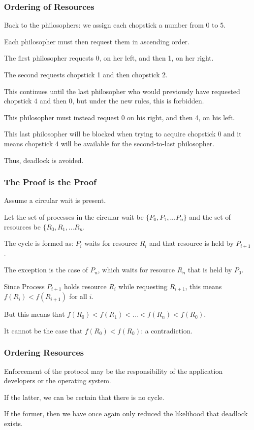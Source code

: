 \begin{frame}
\frametitle{Ordering of Resources}

Back to the philosophers: we assign each chopstick a number from 0 to 5. 

Each philosopher must then request them in ascending order. 

The first philosopher requests 0, on her left, and then 1, on her right. 

The second requests chopstick 1 and then chopstick 2. 

This continues until the last philosopher who would previously have requested chopstick 4 and then 0, but under the new rules, this is forbidden. 

This philosopher must instead request 0 on his right, and then 4, on his left. 

This last philosopher will be blocked when trying to acquire chopstick 0 and it means chopstick 4 will be available for the second-to-last philosopher. 

Thus, deadlock is avoided.

\end{frame}

\begin{frame}
\frametitle{The Proof is the Proof}

Assume a circular wait is present. 

Let the set of processes in the circular wait be $\{P_{0}, P_{1}, ... P_{n}\}$ and the set of resources be $\{R_{0}, R_{1}, ... R_{n}$. 

The cycle is formed as: $P_{i}$ waits for resource $R_{i}$ and that resource is held by $P_{i+1}$. 

The exception is the case of $P_{n}$, which waits for resource $R_{n}$ that is held by $P_{0}$.

Since Process $P_{i+1}$ holds resource $R_{i}$ while requesting $R_{i+1}$, this means $f(R_{i}) < f(R_{i+1})$ for all $i$. 

But this means that $f(R_{0}) < f(R_{1}) < ... < f(R_{n}) < f(R_{0})$. 

It cannot be the case that $f(R_{0}) < f(R_{0})$: a contradiction.

\end{frame}

\begin{frame}
\frametitle{Ordering Resources}

Enforcement of the protocol may be the responsibility of the application developers or the operating system. 

If the latter, we can be certain that there is no cycle. 

If the former, then we have once again only reduced the likelihood that deadlock exists. 

\end{frame}


